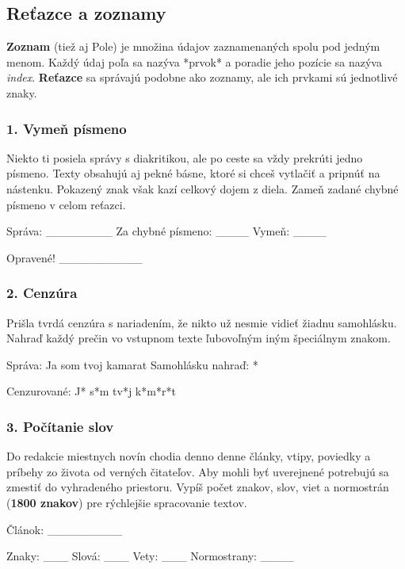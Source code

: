 \subsection{Reťazce a zoznamy}
\textbf{Zoznam} (tiež aj Pole) je množina údajov zaznamenaných spolu pod jedným menom. Každý údaj poľa sa nazýva *prvok* a poradie jeho pozície sa nazýva \textit{index}. \textbf{Reťazce} sa správajú podobne ako zoznamy, ale ich prvkami sú jednotlivé znaky.


\subsubsection*{1. Vymeň písmeno}
Niekto ti posiela správy s diakritikou, ale po ceste sa vždy prekrúti jedno písmeno. Texty obsahujú aj pekné básne, ktoré si chceš vytlačiť a pripnúť na nástenku. Pokazený znak však kazí celkový dojem z diela. Zameň zadané chybné písmeno v celom reťazci.

\begin{code}
Správa: ________
Za chybné písmeno: ____
Vymeň: ____

Opravené!
__________
\end{code}


\subsubsection*{2. Cenzúra}
Prišla tvrdá cenzúra s nariadením, že nikto už nesmie vidieť žiadnu samohlásku. Nahraď každý prečin vo vstupnom texte ľubovoľným iným špeciálnym znakom.

\begin{code}
Správa: Ja som tvoj kamarat
Samohlásku nahraď: *

Cenzurované: J* s*m tv*j k*m*r*t
\end{code}


\subsubsection*{3. Počítanie slov}
Do redakcie miestnych novín chodia denno denne články, vtipy, poviedky a príbehy zo života od verných čitateľov. Aby mohli byť uverejnené potrebujú sa zmestiť do vyhradeného priestoru. Vypíš počet znakov, slov, viet a normostrán (\textbf{1800 znakov}) pre rýchlejšie spracovanie textov.

\begin{code}
Článok: _________

Znaky: ___
Slová: ___
Vety: ___
Normostrany: ____
\end{code}


